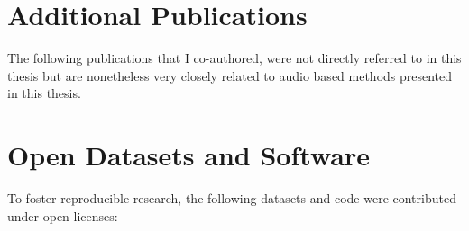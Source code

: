 \section*{Additional Publications}
The following publications that I co-authored, were not directly referred to in this thesis but are nonetheless very closely related to audio based methods presented in this thesis. 
\begin{refsection}
\nocite{*}
\printbibliography[env=numbered+bold, heading=none,resetnumbers=true, sorting=ynt]
\newrefcontext[sorting=nyt]
\end{refsection}

\section*{Open Datasets and Software}
\label{sec:opendatasets}
To foster reproducible research, the following datasets and code were contributed under open licenses:
\begin{refsection}
\nocite{*}
\printbibliography[env=numbered+bold, heading=none,resetnumbers=true, sorting=ynt]
\newrefcontext[sorting=nyt]
\end{refsection}
